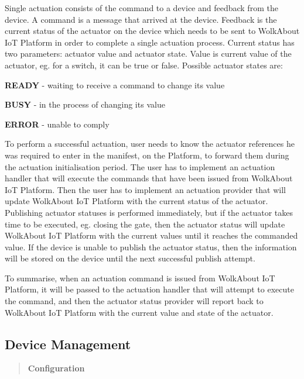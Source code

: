 Single actuation consists of the command to a device and feedback from the device. A command is a message that arrived at the device. Feedback is the current status of the actuator on the device which needs to be sent to Wolk\+About IoT Platform in order to complete a single actuation process. Current status has two parameters\+: actuator value and actuator state. Value is current value of the actuator, eg. for a switch, it can be true or false. Possible actuator states are\+:


\begin{DoxyItemize}
\item {\bfseries R\+E\+A\+DY} -\/ waiting to receive a command to change its value
\item {\bfseries B\+U\+SY} -\/ in the process of changing its value
\item {\bfseries E\+R\+R\+OR} -\/ unable to comply
\end{DoxyItemize}

To perform a successful actuation, user needs to know the actuator references he was required to enter in the manifest, on the Platform, to forward them during the actuation initialisation period. The user has to implement an actuation handler that will execute the commands that have been issued from Wolk\+About IoT Platform. Then the user has to implement an actuation provider that will update Wolk\+About IoT Platform with the current status of the actuator. Publishing actuator statuses is performed immediately, but if the actuator takes time to be executed, eg. closing the gate, then the actuator status will update Wolk\+About IoT Platform with the current values until it reaches the commanded value. If the device is unable to publish the actuator status, then the information will be stored on the device until the next successful publish attempt.

To summarise, when an actuation command is issued from Wolk\+About IoT Platform, it will be passed to the actuation handler that will attempt to execute the command, and then the actuator status provider will report back to Wolk\+About IoT Platform with the current value and state of the actuator.

\label{_device-managment}%
 \subsection*{Device Management}



 

\label{_configuration}%
 \begin{quote}
{\bfseries Configuration} \end{quote}


